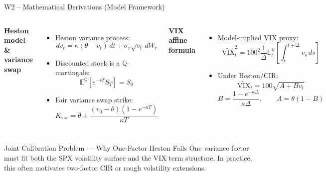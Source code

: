\documentclass[aspectratio=169, 11pt]{beamer}
\begin{document}
\begin{frame}{W2 -- Mathematical Derivations (Model Framework)}

\begin{columns}[T]
\textbf{Heston model \& variance swap}
\begin{itemize}
  \item Heston variance process:
  \[
    dv_t = \kappa(\theta-v_t)\,dt+\sigma_v\sqrt{v_t}\,dW_t
  \]

  \item Discounted stock is a $\mathbb{Q}$-martingale:
  \[
    \mathbb{E}^{\mathbb{Q}}[e^{-rT}S_T]=S_0
  \]

  \item Fair variance swap strike:
  \[
    K_{\mathrm{var}}
    =
    \theta+
    \frac{(v_0-\theta)(1-e^{-\kappa T})}{\kappa T}
  \]
\end{itemize}

\textbf{VIX affine formula}
\begin{itemize}
  \item Model-implied VIX proxy:
  \[
    \widetilde{\mathrm{VIX}}_t^2
    =
    100^2
    \frac{1}{\Delta}
    \mathbb{E}_t^{\mathbb{Q}}
    \left[
    \int_t^{t+\Delta}v_s\,ds
    \right]
  \]

  \item Under Heston/CIR:
  \[
    \widetilde{\mathrm{VIX}}_t
    =
    100\sqrt{A+Bv_t}
  \]
  \[
    B=\frac{1-e^{-\kappa\Delta}}{\kappa\Delta},
    \qquad
    A=\theta(1-B)
  \]
\end{itemize}
\end{columns}

\vspace{3pt}
\begin{block}{Joint Calibration Problem --- Why One-Factor Heston Fails}
\small
One variance factor must fit both the SPX volatility surface and the VIX term structure.
In practice, this often motivates two-factor CIR or rough volatility extensions.
\end{block}
\end{frame}
\end{document}
